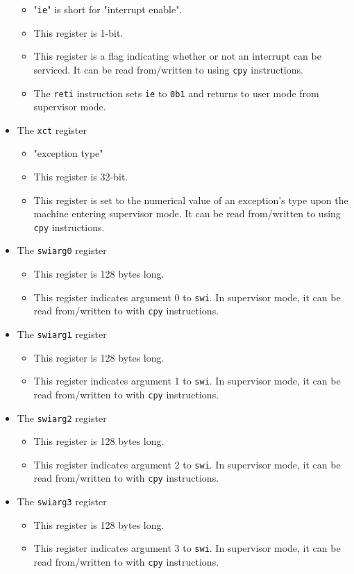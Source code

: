 \documentclass{article}
\begin{document}
\begin{itemize}
		\begin{itemize}
		\item "\texttt{ie}" is short for "interrupt enable".
		\item This register is 1-bit.
		\item This register is a flag indicating whether or not an
			interrupt can be serviced. It can be read from/written to using
			\texttt{cpy} instructions.
		\item The \texttt{reti} instruction sets \texttt{ie} to
			\texttt{0b1} and returns to user mode from supervisor mode.
		\end{itemize}
	\item The \texttt{xct} register
		\begin{itemize}
		\item "exception type"
		\item This register is 32-bit.
		\item This register is set to the numerical value of an exception's
			type upon the machine entering supervisor mode. It can be read
			from/written to using \texttt{cpy} instructions.
		\end{itemize}
	\item The \texttt{swiarg0} register
		\begin{itemize}
		\item This register is 128 bytes long.
		\item This register indicates argument 0 to \texttt{swi}. In
			supervisor mode, it can be read from/written to with
			\texttt{cpy} instructions.
		\end{itemize}
	\item The \texttt{swiarg1} register
		\begin{itemize}
		\item This register is 128 bytes long.
		\item This register indicates argument 1 to \texttt{swi}. In
			supervisor mode, it can be read from/written to with
			\texttt{cpy} instructions.
		\end{itemize}
	\item The \texttt{swiarg2} register
		\begin{itemize}
		\item This register is 128 bytes long.
		\item This register indicates argument 2 to \texttt{swi}. In
			supervisor mode, it can be read from/written to with
			\texttt{cpy} instructions.
		\end{itemize}
	\item The \texttt{swiarg3} register
		\begin{itemize}
		\item This register is 128 bytes long.
		\item This register indicates argument 3 to \texttt{swi}. In
			supervisor mode, it can be read from/written to with
			\texttt{cpy} instructions.
		\end{itemize}
	\end{itemize}
	\newpage
\end{document}

